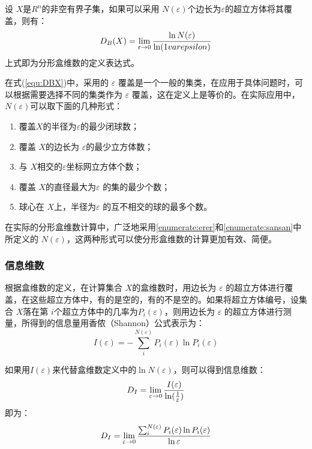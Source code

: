 设 $X$是$R^n$的非空有界子集，如果可以采用 $N(\varepsilon)$个边长为$\varepsilon$的超立方体将其覆盖，则有：
\begin{equation}
\label{equ:DBX}
	D_B(X) =  \lim \limits_{\varepsilon\rightarrow0}{\ln N(\varepsilon) \over \ln ({1\\varepsilon})} 
\end{equation}
上式即为分形盒维数的定义表达式。

在式(\ref{equ:DBX})中，采用的 $\varepsilon$ 覆盖是一个一般的集类，在应用于具体问题时，可以根据需要选择不同的集类作为 $\varepsilon$ 覆盖，这在定义上是等价的。在实际应用中，$N(\varepsilon)$可以取下面的几种形式：
\begin{enumerate}[label=（\arabic*）]
	\item 覆盖$X$的半径为$\varepsilon$的最少闭球数； 	
	\item{\label{enumerate:erer}} 覆盖 $X$的边长为 $\varepsilon$的最少立方体数；	
	\item{\label{enumerate:sansan}} 与  $X$相交的$\varepsilon$坐标网立方体个数；	
	\item 覆盖 $X$的直径最大为$\varepsilon$ 的集的最少个数； 	
	\item 球心在  $X$上，半径为$\varepsilon$ 的互不相交的球的最多个数。 	
\end{enumerate}
在实际的分形盒维数计算中，广泛地采用\ref{enumerate:erer}和\ref{enumerate:sansan}中所定义的 $N(\varepsilon)$，这两种形式可以使分形盒维数的计算更加有效、简便。

\subsubsection{信息维数}
根据盒维数的定义，在计算集合 $X$的盒维数时，用边长为 $\varepsilon$ 的超立方体进行覆盖，在这些超立方体中，有的是空的，有的不是空的。如果将超立方体编号，设集合 $X$落在第 $i $个超立方体中的几率为$P_i(\varepsilon)$，则用边长为 $\varepsilon$ 的超立方体进行测量，所得到的信息量用香侬（Shannon）公式表示为：
\begin{equation}
	I(\varepsilon) = - \sum_{i}^{N(\varepsilon)} P_i(\varepsilon) \ln P_i(\varepsilon)
\end{equation}

如果用$I(\varepsilon)$来代替盒维数定义中的$\ln N(\varepsilon)$，则可以得到信息维数：
\begin{equation}
	D_I = \lim \limits_{\varepsilon\rightarrow0} {I(\varepsilon) \over \ln({1\over \varepsilon})}
\end{equation}
即为：
\begin{equation}
	D_I = \lim \limits_{\varepsilon\rightarrow0} {
		\sum_{i}^{N(\varepsilon)} P_i(\varepsilon) \ln P_i(\varepsilon)
		 \over  \ln\varepsilon}
\end{equation}

